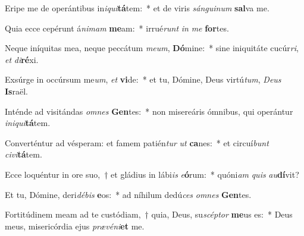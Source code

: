\item Eripe me de operántibus in\textit{i}\textit{qui}\textbf{tá}tem:~* et de viris \textit{sán}\textit{gui}\textit{num} \textbf{sal}va me.
\item Quia ecce cepérunt á\textit{ni}\textit{mam} \textbf{me}am:~* irrué\textit{runt} \textit{in} \textit{me} \textbf{for}tes.
\item Neque iníquitas mea, neque peccátum \textit{me}\textit{um}, \textbf{Dó}mine:~* sine iniquitáte cucúr\textit{ri}, \textit{et} \textit{di}\textbf{ré}xi.
\item Exsúrge in occúrsum me\textit{um}, \textit{et} \textbf{vi}de:~* et tu, Dómine, Deus virtú\textit{tum}, \textit{De}\textit{us} \textbf{Is}raël.
\item Inténde ad visitándas \textit{om}\textit{nes} \textbf{Gen}tes:~* non misereáris ómnibus, qui operántur \textit{in}\textit{i}\textit{qui}\textbf{tá}tem.
\item Converténtur ad vésperam: et famem patién\textit{tur} \textit{ut} \textbf{ca}nes:~* et circuí\textit{bunt} \textit{ci}\textit{vi}\textbf{tá}tem.
\item Ecce loquéntur in ore suo,~† et gládius in lábi\textit{is} \textit{e}\textbf{ó}rum:~* quóni\textit{am} \textit{quis} \textit{au}\textbf{dí}vit?
\item Et tu, Dómine, deri\textit{dé}\textit{bis} \textbf{e}os:~* ad níhilum dedú\textit{ces} \textit{om}\textit{nes} \textbf{Gen}tes.
\item Fortitúdinem meam ad te custódiam,~† quia, Deus, su\textit{scép}\textit{tor} \textbf{me}us es:~* Deus meus, misericórdia ejus \textit{præ}\textit{vé}\textit{ni}\textbf{et} me.
